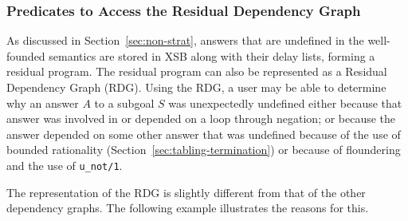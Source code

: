 \subsubsection{Predicates to Access the Residual Dependency Graph} \label{sec:rdg-preds}

As discussed in Section~\ref{sec:non-strat}, answers that are
undefined in the well-founded semantics are stored in XSB along with
their delay lists, forming a residual program.  The residual program
can also be represented as a Residual Dependency Graph (RDG).  Using
the RDG, a user may be able to determine why an answer $A$ to a
subgoal $S$ was unexpectedly undefined either because that answer was
involved in or depended on a loop through negation; or because the
answer depended on some other answer that was undefined because of the
use of bounded rationality (Section~\ref{sec:tabling-termination}) or
because of floundering and the use of {\tt u\_not/1}.

The representation of the RDG is slightly different from that of the
other dependency graphs.  The following example illustrates the
reasons for this.

